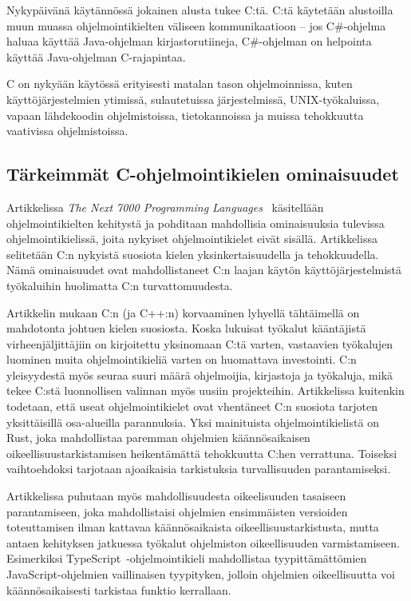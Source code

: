 Nykypäivänä käytännössä jokainen alusta tukee C:tä. C:tä käytetään alustoilla
muun muassa ohjelmointikielten väliseen kommunikaatioon -- jos C\#-ohjelma
haluaa käyttää Java-ohjelman kirjastorutiineja, C\#-ohjelman on helpointa
käyttää Java-ohjelman C-rajapintaa.

C on nykyään käytössä erityisesti matalan tason ohjelmoinnissa, kuten
käyttöjärjestelmien ytimissä, sulautetuissa järjestelmissä, UNIX-työkaluissa,
vapaan lähdekoodin ohjelmistoissa, tietokannoissa ja muissa tehokkuutta
vaativissa ohjelmistoissa.

\subsection{Tärkeimmät C-ohjelmointikielen ominaisuudet}
\label{sec:cominaisuudet}

Artikkelissa \emph{The Next 7000 Programming Languages}~\citep{next7000}
käsitellään ohjelmointikielten kehitystä ja pohditaan mahdollisia ominaisuuksia
tulevissa ohjelmointikielissä, joita nykyiset ohjelmointikielet eivät sisällä.
Artikkelissa selitetään C:n nykyistä suosiota kielen yksinkertaisuudella ja
tehokkuudella. Nämä ominaisuudet ovat mahdollistaneet C:n laajan käytön
käyttöjärjestelmistä työkaluihin huolimatta C:n turvattomuudesta.

Artikkelin mukaan C:n (ja C++:n) korvaaminen lyhyellä tähtäimellä on mahdotonta
johtuen kielen suosiosta. Koska lukuisat työkalut kääntäjistä
virheenjäljittäjiin on kirjoitettu yksinomaan C:tä varten,
vastaavien työkalujen luominen muita ohjelmointikieliä varten on huomattava
investointi. C:n yleisyydestä myös seuraa suuri määrä ohjelmoijia, kirjastoja
ja työkaluja, mikä tekee C:stä luonnollisen valinnan myös uusiin projekteihin.
Artikkelissa kuitenkin todetaan, että useat ohjelmointikielet ovat vhentäneet
C:n suosiota tarjoten yksittäisillä osa-alueilla parannuksia. Yksi mainituista
ohjelmointikielistä on Rust, joka mahdollistaa paremman ohjelmien
käännösaikaisen oikeellisuustarkistamisen heikentämättä tehokkuutta C:hen
verrattuna. Toiseksi vaihtoehdoksi tarjotaan ajoaikaisia tarkistuksia
turvallisuuden parantamiseksi.

Artikkelissa puhutaan myös mahdollisuudesta oikeelisuuden tasaiseen
parantamiseen, joka mahdollistaisi ohjelmien
ensimmäisten versioiden toteuttamisen ilman kattavaa käännösaikaista
oikeellisuustarkistusta, mutta antaen kehityksen jatkuessa työkalut ohjelmiston
oikeellisuuden varmistamiseen. Esimerkiksi
TypeScript~\citep{typescript}-ohjelmointikieli mahdollistaa tyypittämättömien
JavaScript-ohjelmien vaillinaisen tyypityken, jolloin
ohjelmien oikeellisuutta voi käännösaikaisesti tarkistaa funktio kerrallaan. 

